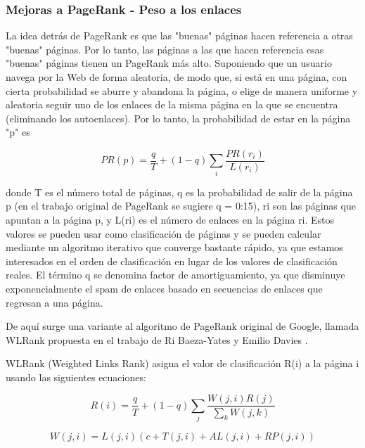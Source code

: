\subsubsection{Mejoras a PageRank - Peso a los enlaces}

La idea detrás de PageRank es que las "buenas" páginas hacen referencia a otras "buenas" páginas. Por lo tanto, las páginas a las que hacen referencia esas "buenas" páginas tienen un PageRank más alto. Suponiendo que un usuario navega por la Web de forma aleatoria, de modo que, si está en una página, con cierta probabilidad se aburre y abandona la página, o elige de manera uniforme y aleatoria seguir uno de los enlaces de la misma página en la que se encuentra (eliminando los autoenlaces). Por lo tanto, la probabilidad de estar en la página "p" es

\begin{equation} 
	\label{eqn:ecuacionWLRank1} 
	PR(p) = \frac{q}{T} + (1 - q) \sum_{i} \frac{PR(r_i)}{L(r_i)} 
\end{equation}

donde T es el número total de páginas, q es la probabilidad de salir de la página p (en el trabajo original de PageRank se sugiere q = 0:15), ri son las páginas que apuntan a la página p, y L(ri) es el número de enlaces en la página ri. Estos valores se pueden usar como clasificación de páginas y se pueden calcular mediante un algoritmo iterativo que converge bastante rápido, ya que estamos interesados en el orden de clasificación en lugar de los valores de clasificación reales. El término q se denomina factor de amortiguamiento, ya que disminuye exponencialmente el spam de enlaces basado en secuencias de enlaces que regresan a una página.

De aquí surge una variante al algoritmo de PageRank original de Google, llamada WLRank propuesta en el trabajo de Ri Baeza-Yates y Emilio Davies \cite{baeza2004web}.

WLRank (Weighted Links Rank) asigna el valor de clasificación R(i) a la página i usando las siguientes ecuaciones:

\begin{equation} 
	\label{eqn:ecuacionWLRank2} 
	R(i) = \frac{q}{T} + (1 - q) \sum_{j} \frac{W(j,i)R(j)}{\sum_{k}W(j,k)} 
\end{equation}

\begin{equation} 
	\label{eqn:ecuacionWLRank3} 
	W(j,i) = L(j,i)(c+T(j,i)+AL(j,i)+RP(j,i))
\end{equation}

